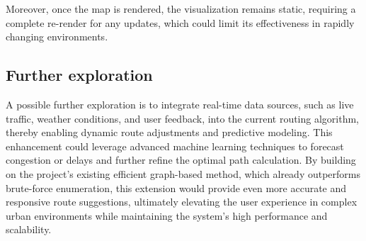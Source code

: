 \documentclass[12pt]{article}
\begin{document}
	Moreover, once the map is rendered, the visualization remains static, requiring a complete re-render for any updates, which could limit its effectiveness in rapidly changing environments.
	
	\subsection*{Further exploration}
	A possible further exploration is to integrate real-time data sources, such as live traffic, weather conditions, and user feedback, into the current routing algorithm, thereby enabling dynamic route adjustments and predictive modeling. This enhancement could leverage advanced machine learning techniques to forecast congestion or delays and further refine the optimal path calculation. By building on the project's existing efficient graph-based method, which already outperforms brute-force enumeration, this extension would provide even more accurate and responsive route suggestions, ultimately elevating the user experience in complex urban environments while maintaining the system's high performance and scalability.
	
	
	\printbibliography
	
\end{document}

